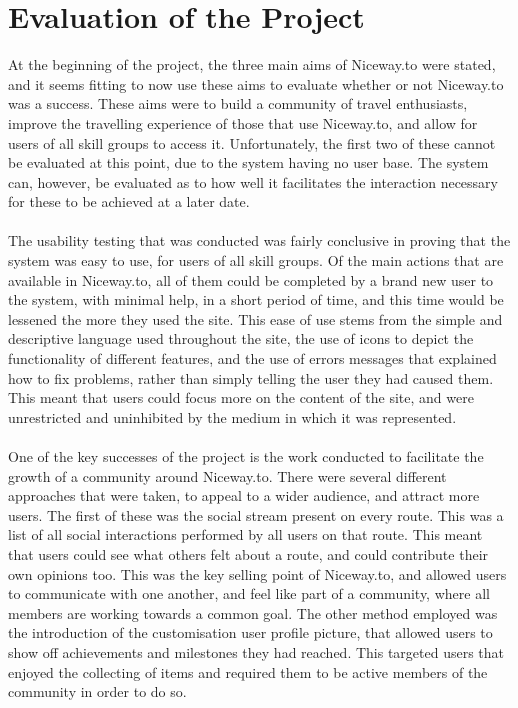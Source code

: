 \section{Evaluation of the Project}
\label{sec:eval}
At the beginning of the project, the three main aims of Niceway.to were stated, and it seems fitting to now use these aims to evaluate whether or not Niceway.to was a success. These aims were to build a community of travel enthusiasts, improve the travelling experience of those that use Niceway.to, and allow for users of all skill groups to access it. Unfortunately, the first two of these cannot be evaluated at this point, due to the system having no user base. The system can, however, be evaluated as to how well it facilitates the interaction necessary for these to be achieved at a later date.\ \\
\ \\
The usability testing that was conducted was fairly conclusive in proving that the system was easy to use, for users of all skill groups. Of the main actions that are available in Niceway.to, all of them could be completed by a brand new user to the system, with minimal help, in a short period of time, and this time would be lessened the more they used the site. This ease of use stems from the simple and descriptive language used throughout the site, the use of icons to depict the functionality of different features, and the use of errors messages that explained how to fix problems, rather than simply telling the user they had caused them. This meant that users could focus more on the content of the site, and were unrestricted and uninhibited by the medium in which it was represented.
\ \\
\ \\
One of the key successes of the project is the work conducted to facilitate the growth of a community around Niceway.to. There were several different approaches that were taken, to appeal to a wider audience, and attract more users. The first of these was the social stream present on every route. This was a list of all social interactions performed by all users on that route. This meant that users could see what others felt about a route, and could contribute their own opinions too. This was the key selling point of Niceway.to, and allowed users to communicate with one another, and feel like part of a community, where all members are working towards a common goal. The other method employed was the introduction of the customisation user profile picture, that allowed users to show off achievements and milestones they had reached. This targeted users that enjoyed the collecting of items and required them to be active members of the community in order to do so.\ \\
